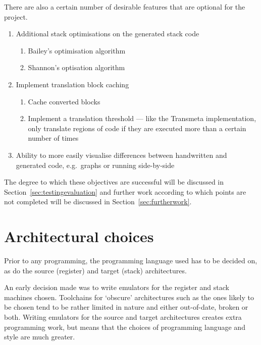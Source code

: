 \noindent There are also a certain number of desirable features that are
optional for the project.

\begin{enumerate}[noitemsep,resume,label=R\arabic*]
  \item Additional stack optimisations on the generated stack
    code\label{itm:moreoptimise}
  \begin{enumerate}[noitemsep,label=\theenumi.\arabic*]
    \item Bailey's optimisation algorithm~\cite{Bailey2000Inter}
    \item Shannon's optisation algorithm~\cite{Shannon2006AC}
  \end{enumerate}
  \item Implement translation block
    caching~\cite{TransmetaCodeMorph}\label{itm:caching}
  \begin{enumerate}[noitemsep,label=\theenumi.\arabic*]
    \item Cache converted blocks
    \item Implement a translation threshold --- like the Transmeta
      implementation, only translate regions of code if they are executed more
      than a certain number of times
  \end{enumerate}
  \item Ability to more easily visualise differences between handwritten and
    generated code, e.g.\ graphs or running side-by-side\label{itm:visualise}
\end{enumerate}

The degree to which these objectives are successful will be discussed in
Section~\ref{sec:testingevaluation} and further work according to which points
are not completed will be discussed in Section~\ref{sec:furtherwork}.


\section{Architectural choices}
Prior to any programming, the programming language used has to be decided on, as
do the source (register) and target (stack) architectures.

An early decision made was to write emulators for the register and stack
machines chosen. Toolchains for `obscure' architectures such as the ones likely
to be chosen tend to be rather limited in nature and either out-of-date, broken
or both. Writing emulators for the source and target architectures creates extra
programming work, but means that the choices of programming language and style
are much greater.

